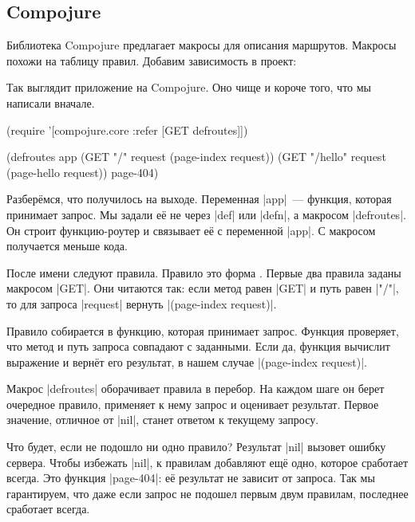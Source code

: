 \subsection{Compojure}

\label{compojure}

Библиотека Compojure
предлагает макросы для описания маршрутов. Макросы похожи на таблицу правил.
Добавим зависимость в проект:

\begin{english}
  \begin{clojure}
[compojure "1.6.1"]
  \end{clojure}
\end{english}

Так выглядит приложение на Compojure. Оно чище и короче того, что мы написали
вначале.

\begin{english}
  \begin{clojure}
(require '[compojure.core :refer [GET defroutes]])

(defroutes app
  (GET "/"      request (page-index request))
  (GET "/hello" request (page-hello request))
  page-404)
  \end{clojure}
\end{english}

Разбер\"{е}мся, что получилось на выходе. Переменная \spverb|app|~--- функция,
которая принимает запрос. Мы задали е\"{е} не через \spverb|def| или \spverb|defn|,
а макросом \spverb|defroutes|. Он строит функцию-роутер и связывает е\"{е} с
переменной \spverb|app|. С макросом получается меньше кода.

После имени следуют правила. Правило это форма .
Первые два правила заданы макросом \spverb|GET|. Они читаются так:
если метод равен \spverb|GET| и путь равен \spverb|"/"|, то для запроса
\spverb|request| вернуть \spverb|(page-index request)|.

Правило собирается в функцию, которая принимает запрос. Функция проверяет, что
метод и путь запроса совпадают с заданными. Если да, функция вычислит выражение
и верн\"{е}т его результат, в нашем случае \spverb|(page-index request)|.

Макрос \spverb|defroutes| оборачивает правила в перебор. На каждом шаге он берет
очередное правило, применяет к нему запрос и оценивает результат. Первое
значение, отличное от \spverb|nil|, станет ответом к текущему запросу.

Что будет, если не подошло ни одно правило? Результат \spverb|nil| вызовет
ошибку сервера. Чтобы избежать \spverb|nil|, к правилам добавляют ещ\"{е} одно,
которое сработает всегда. Это функция \spverb|page-404|: е\"{е} результат не
зависит от запроса. Так мы гарантируем, что даже если запрос не подошел первым
двум правилам, последнее сработает всегда.

